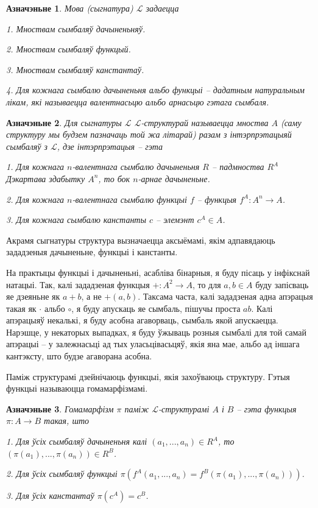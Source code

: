 \documentclass[a4paper,12pt]{book}
\newtheorem{definition}{Азначэньне}[section]
\begin{document}
\begin{definition}
  Мова (сыгнатура) $\mathcal{L}$ задаецца

  1. Мноствам сымбаляў дачыненьняў.

  2. Мноствам сымбаляў функцый.

  3. Мноствам сымбаляў канстантаў.

  4. Для кожнага сымбалю дачыненьня альбо функцыі -- дадатным
  натуральным лікам, які называецца валентнасьцю альбо арнасьцю гэтага
  сымбаля.
\end{definition}

\begin{definition}
  Для сыгнатуры $\mathcal{L}$ $\mathcal{L}$-структурай называецца
  мноства $A$ (саму структуру мы будзем пазначаць той жа літарай)
  разам з інтэрпрэтацыяй сымбаляў з $\mathcal{L}$, дзе
  інтэрпрэтацыя -- гэта

  1. Для кожнага $n$-валентнага сымбалю дачыненьня $R$ -- падмноства
  $R^{A}$ Дэкартава здабытку $A^n$, то бок $n$-арнае дачыненьне.

  2. Для кожнага $n$-валентнага сымбалю функцыі $f$ -- функцыя $f^A:
  A^n \rightarrow A$.

  3. Для кожнага сымбалю канстанты $c$ -- элемэнт $c^A \in A$.
\end{definition}

Акрамя сыгнатуры структура вызначаецца аксыёмамі, якім адпавядаюць
зададзеныя дачыненьне, функцыі і канстанты.

На практыцы функцыі і дачыненьні, асабліва бінарныя, я буду пісаць
у інфікснай натацыі. Так, калі зададзеная функцыя $+: A^2 \rightarrow
A$, то для $a, b \in A$ буду запісваць яе дзеяньне як $a + b$, а
не $+(a, b)$. Таксама часта, калі зададзеная адна апэрацыя такая як
$\cdot$ альбо $\circ$, я буду апускаць яе сымбаль, пішучы проста
$ab$. Калі апэрацыяў некалькі, я буду асобна агаворваць, сымбаль
якой апускаецца. Нарэшце, у некаторых выпадках, я буду ўжываць розныя
сымбалі для той самай апэрацыі -- у залежнасьці ад тых уласьцівасьцяў,
якія яна мае, альбо ад іншага кантэксту, што будзе агаворана асобна.

Паміж структурамі дзейнічаюць функцыі, якія захоўваюць
структуру. Гэтыя функцыі называюцца гомамарфізмамі.

\begin{definition}
  Гомамарфізм $\pi$ паміж $\mathcal{L}$-структурамі $A$ і $B$ -- гэта
  функцыя $\pi: A \rightarrow B$ такая, што

  1. Для ўсіх сымбаляў дачыненьня калі $(a_1, ..., a_n) \in R^A$, то
  $(\pi(a_1), ..., \pi(a_n)) \in R^B$.

  2. Для ўсіх сымбаляў функцыі $\pi(f^A(a_1, ..., a_n) = f^B(\pi(a_1),
  ..., \pi(a_n)))$.

  3. Для ўсіх канстантаў $\pi(c^A) = c^B$.
\end{definition}
\end{document}
